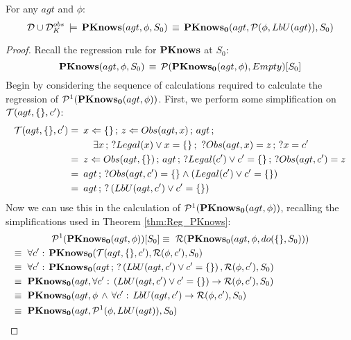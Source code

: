 \begin{lemmaext}
[\ref{lem:Pknows_LbU_S0}] For any $agt$ and $\phi$:\[
\mathcal{D}\cup\mathcal{D}_{K}^{obs}\,\models\,\mathbf{PKnows}(agt,\phi,S_{0})\,\equiv\,\mathbf{PKnows_{0}}(agt,\mathcal{P}(\phi,LbU(agt)),S_{0})\]

\end{lemmaext}
\begin{proof}
Recall the regression rule for $\mathbf{PKnows}$ at $S_{0}$:\[
\mathbf{PKnows}(agt,\phi,S_{0})\,\equiv\,\mathcal{P}(\mathbf{PKnows_{0}}(agt,\phi),Empty)[S_{0}]\]
 Begin by considering the sequence of calculations required to calculate
the regression of $\mathcal{P}^{1}(\mathbf{PKnows_{0}}(agt,\phi))$. First, we perform
some simplification on $\mathcal{T}(agt,\{\},c')$:\begin{align*}
\mathcal{T}(agt,\{\},c')=\,\,\, & x\Leftarrow\{\}\,;\, z\Leftarrow Obs(agt,x)\,;\, agt\,;\\
 & \,\,\,\,\,\,\exists x\,;\,?Legal(x)\vee x=\{\}\,;\,\,?Obs(agt,x)=z\,;\,?x=c'\\
=\,\,\, & z\Leftarrow Obs(agt,\{\})\,;\, agt\,;\,?Legal(c')\vee c'=\{\}\,;\,?Obs(agt,c')=z\\
=\,\,\, & agt\,;\,?Obs(agt,c')=\{\}\wedge\left(Legal(c')\vee c'=\{\}\right)\\
=\,\,\, & agt\,;\,?\left(LbU(agt,c')\vee c'=\{\}\right)\end{align*}
 Now we can use this in the calculation of $\mathcal{P}^{1}(\mathbf{PKnows_{0}}(agt,\phi))$,
recalling the simplifications used in Theorem \ref{thm:Reg_PKnows}:\begin{multline*}
\Pst^{1}(\PKnowsZ(agt,\phi))[S_{0}]\equiv\,\,\Reg(\PKnows_{0}(agt,\phi,do(\{\},S_{0})))\\
\shoveleft{\equiv\,\,\forall c':\,\PKnowsZ(\Trn(agt,\{\},c'),\Reg(\phi,c'),S_{0})}\\
\shoveleft{\equiv\,\,\forall c':\,\PKnowsZ(agt\,;\,?\left(\LbU(agt,c')\vee c'=\{\}\right),\Reg(\phi,c'),S_{0})}\\
\shoveleft{\equiv\,\,\PKnowsZ(agt,\forall c':\,\left(\LbU(agt,c')\vee c'=\{\}\right)\rightarrow\Reg(\phi,c'),S_{0})}\\
\shoveleft{\equiv\,\,\PKnowsZ(agt,\phi\,\wedge\,\forall c':\, LbU(agt,c')\rightarrow\Reg(\phi,c'),S_{0})}\\
\shoveleft{\equiv\,\,\PKnowsZ(agt,\Pst^{1}(\phi,\LbU(agt)),S_{0})}\,\,\,\,\,\,\,\,\,\,\,\,\,\,\,\,\,\,\,\,\,\,\,\,\,\,\,\,\,\,\,\,\,\,\,\,\,\,\,\,\,\,\,\,\,\,\,\,\,\,\,\,\,\,\,\,\,\,\,\,\,\,\,\,\,\,\,\,\,\,\,\,\,\,\,\,\,\,\,\,\,\,\,\,\,\,\,\,\,\,\,\,\,\,\,\,\,\,\,\,\,\,\,\,\,\,\,\,\,\,\,\,\,\end{multline*}



\end{proof}
